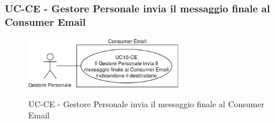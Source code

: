 \subsubsection{UC\theuccount-CE - Gestore Personale invia il messaggio finale al Consumer Email}
	\begin{figure}[H]
		\centering
		\includegraphics[width=0.6\textwidth]{img/casi_d'uso/UC10.png}\\
		\caption{UC\theuccount-CE - Gestore Personale invia il messaggio finale al Consumer Email}
	\end{figure}
